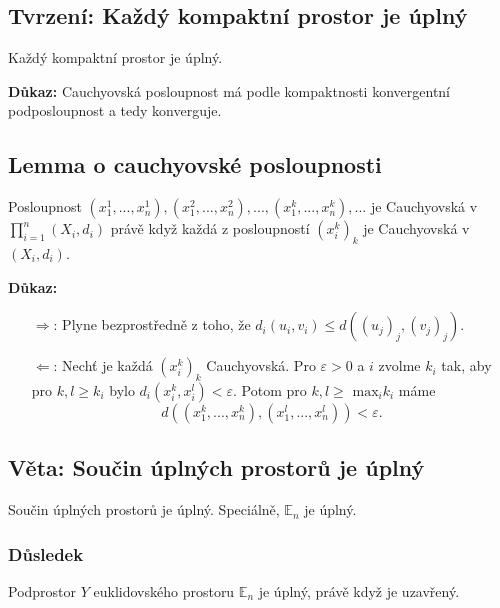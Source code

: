 \documentclass[../main.tex]{subfiles}
\begin{document}
\subsection{Tvrzení: Každý kompaktní prostor je úplný}
\hspace{1.2mm}
\noindent
Každý kompaktní prostor je úplný.

\vspace{5mm}
\noindent
\textbf{Důkaz:} Cauchyovská posloupnost má podle kompaktnosti konvergentní podposloupnost a tedy konverguje.

\subsection{Lemma o cauchyovské posloupnosti}
\hspace{1.2mm}
\noindent
Posloupnost $(x_{1}^{1}, ... , x_{n}^{1}), (x_{1}^{2},...,x_{n}^{2}), ...,(x_{1}^{k},...,x_{n}^{k}),...$
je Cauchyovská v $\prod_{i=1}^{n}(X_i, d_i)$ právě když každá z posloupností $(x_{i}^{k})_k$ je
Cauchyovská v $(X_i, d_i)$.

\vspace{5mm}
\noindent
\textbf{Důkaz:}
\begin{itemize}
    \item[ $\Rightarrow$:] Plyne bezprostředně z toho, že $d_i(u_i,v_i) \leq d((u_j)_j,(v_j)_j).$
    \item[ $\Leftarrow$:] Nechť je každá $(x_i^k)_k$ Cauchyovská. Pro $\varepsilon > 0$ a $i$ zvolme $k_i$ tak,
    aby pro $k,l \geq k_i$ bylo $d_i(x_i^k, x_i^l) < \varepsilon.$ Potom pro $k,l \geq$ $\text{max}_i k_i$ máme 
    \[d((x_1^k,...,x_n^k),(x_1^l,...,x_n^l)) < \varepsilon.\]
\end{itemize}

\subsection{Věta: Součin úplných prostorů je úplný }
\hspace{1.2mm}
\noindent
Součin úplných prostorů je úplný. Speciálně, $\mathbb{E}_n$ je úplný.

\subsubsection{Důsledek}
\hspace{1.2mm}
\noindent
Podprostor $Y$ euklidovského prostoru $\mathbb{E}_n$ je úplný, právě když je uzavřený.
\end{document}
